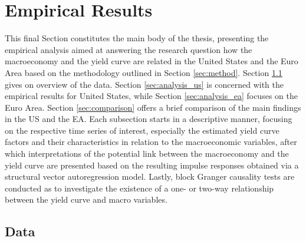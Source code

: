 \section{Empirical Results}
\label{sec:analysis}

This final Section constitutes the main body of the thesis, presenting the empirical analysis aimed at answering the research question how the macroeconomy and the yield curve are related in the United States and the Euro Area based on the methodology outlined in Section \ref{sec:method}. 
Section \ref{sec:data} gives on overview of the data.
Section \ref{sec:analysis_us} is concerned with the empirical results for United States, while Section \ref{sec:analysis_ea} focuses on the Euro Area. 
Section \ref{sec:comparison} offers a brief comparison of the main findings in the US and the EA.  
Each subsection starts in a descriptive manner, focusing on the respective time series of interest, especially the estimated yield curve factors and their characteristics in relation to the macroeconomic variables, after which interpretations of the potential link between the macroeconomy and the yield curve are presented based on the resulting impulse responses obtained via a structural vector autoregression model. 
Lastly, block Granger causality tests are conducted as to investigate the existence of a one- or two-way relationship between the yield curve and macro variables.  

\subsection{Data}
\label{sec:data}

